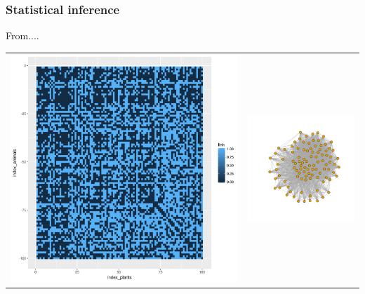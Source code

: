 \documentclass[nopagenumber,9pt]{beamer}
\begin{document}
\begin{frame}\frametitle{Statistical inference} 

From.... 

\centering
\begin{tabular}{cc}
 \includegraphics[scale=.2]{plots/sbm/Nested_adja.png}&
 \includegraphics[scale=.2]{plots/sbm/Nested_graphe_without_colors.png}
\end{tabular}
\end{frame}
\end{document}
